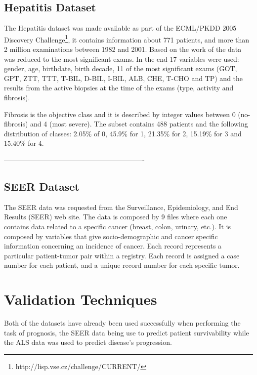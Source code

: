 \subsection{Hepatitis Dataset}
\label{subsection:hepatitis}

The Hepatitis dataset was made available as part of the ECML/PKDD 2005 Discovery 
Challenge\footnote{http://lisp.vse.cz/challenge/CURRENT/}, it contains information about
 771 patients, and more than 2 million examinations between 1982 and 2001. Based on the work of \cite{Watanabe2003}
 the data was reduced to the most significant exams. In the end 17 variables were used: gender, age, birthdate, birth decade, 
 11 of the most significant exams (GOT, GPT, ZTT, TTT, T-BIL, D-BIL, I-BIL, ALB, CHE, T-CHO and TP) and the results from the
 active biopsies at the time of the exams (type, activity and fibrosis).

Fibrosis is the objective class and it is described by integer values between 0 (no-fibrosis) and 4 (most severe).
 The subset contains 488 patients and the following distribution of 
 classes: 2.05\% of 0, 45.9\% for 1, 21.35\% for 2, 15.19\% for 3 and 15.40\% for 4.

-------------------------------------------------------------

\subsection{SEER Dataset}
\label{subsection:seer}

The SEER data was requested from the Surveillance, Epidemiology, and End Results (SEER) web site. The data is composed by 9 files where each 
one contains data related to a specific cancer (breast, colon, urinary, etc.). It is composed by variables that give socio-demographic and
 cancer specific information concerning an incidence of cancer. Each record represents a particular patient-tumor pair within a registry. Each
 record is assigned a case number for each patient, and a unique record number for each specific tumor.



 \section{Validation Techniques}
\label{section:validation}

Both of the datasets have already been used successfully when performing the task of prognosis, the SEER data being use to predict patient 
survivability while the ALS data was used to predict disease’s progression. 

